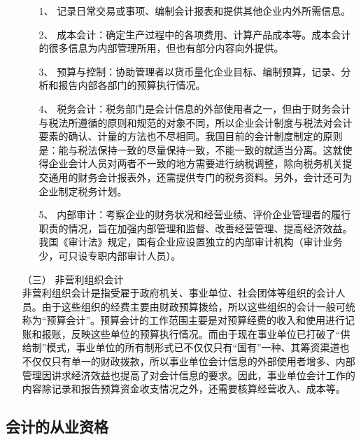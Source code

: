 \begin{enumerate}
						\begin{enumerate}
							\item[1、] 记录日常交易或事项、编制会计报表和提供其他企业内外所需信息。
							\item[2、] 成本会计：确定生产过程中的各项费用、计算产品成本等。成本会计的很多信息为内部管理所用，但也有部分内容向外提供。
							\item[3、] 预算与控制：协助管理者以货币量化企业目标、编制预算，记录、分析和报告内部各部门的预算执行情况。
							\item[4、] 税务会计：税务部门是会计信息的外部使用者之一，但由于财务会计与税法所遵循的原则和规范的对象不同，所以企业会计制度与税法对会计要素的确认、计量的方法也不尽相同。我国目前的会计制度制定的原则是：能与税法保持一致的尽量保持一致，不能一致的就适当分离。这就使得企业会计人员对两者不一致的地方需要进行纳税调整，除向税务机关提交通用的财务会计报表外，还需提供专门的税务资料。另外，会计还可为企业制定税务计划。
							\item[5、] 内部审计：考察企业的财务状况和经营业绩、评价企业管理者的履行职责的情况，旨在加强内部管理和监督、改善经营管理、提高经济效益。我国《审计法》规定，国有企业应设置独立的内部审计机构（审计业务少，可只设专职内部审计人员）。
						\end{enumerate}

					\item[（三）] 非营利组织会计 \\
						非营利组织会计是指受雇于政府机关、事业单位、社会团体等组织的会计人员。由于这些组织的经费主要由财政预算拨给，所以这些组织的会计一般可统称为“预算会计”。预算会计的工作范围主要是对预算经费的收入和使用进行记账和报账，反映这些单位的预算执行情况。而由于现在事业单位已打破了“供给制”模式，事业单位的所有制形式已不仅仅只有“国有”一种、其筹资渠道也不仅仅只有单一的财政拨款，所以事业单位会计信息的外部使用者增多、内部管理因讲求经济效益也提高了对会计信息的要求。因此，事业单位会计工作的内容除记录和报告预算资金收支情况之外，还需要核算经营收入、成本等。

				\end{enumerate}

				\subsection{会计的从业资格}

